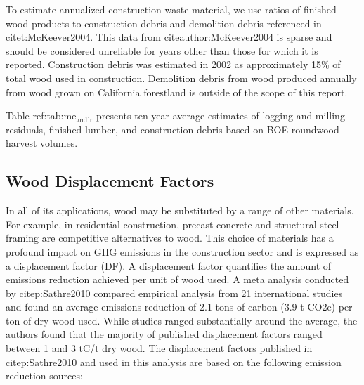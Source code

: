 \documentclass[a4paper]{article}
\begin{document}
To estimate annualized construction waste material, we use ratios of finished wood products to construction debris and demolition debris referenced in citet:McKeever2004. This data from citeauthor:McKeever2004 is sparse and should be considered unreliable for years other than those for which it is reported.  Construction debris was estimated in 2002 as approximately 15\% of total wood used in construction. Demolition debris from wood produced annually from wood grown on California forestland is outside of the scope of this report.

Table ref:tab:me$_{\text{and}}$$_{\text{lr}}$ presents ten year average estimates of logging and milling residuals, finished lumber, and construction debris based on BOE roundwood harvest volumes. 

\subsection{Wood Displacement Factors}
\label{sec-3-2}

In all of its applications, wood may be substituted by a range of other materials. For example, in
residential construction, precast concrete and structural steel framing
are competitive alternatives to wood. This choice of materials has a profound impact on GHG emissions in the
construction sector and is expressed as a displacement
factor (DF). A displacement factor quantifies the amount of emissions
reduction achieved per unit of wood used. A meta analysis conducted by citep:Sathre2010 compared empirical analysis from 21 international studies and found an
average emissions reduction of 2.1 tons of carbon (3.9 t CO2e) per ton
of dry wood used. While studies ranged substantially around the average, the
authors found that the majority of published displacement factors ranged
between 1 and 3 tC/t dry wood. The displacement factors published in
citep:Sathre2010 and used in this analysis are based on the
following emission reduction sources:
\end{document}
